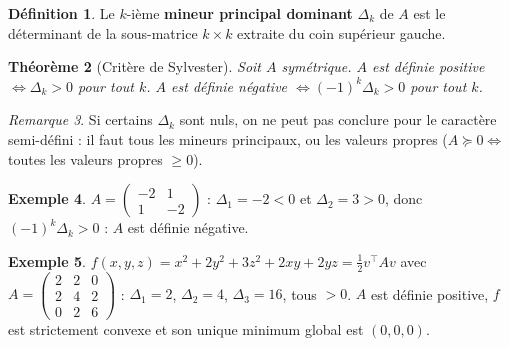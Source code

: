 \documentclass[a4paper,11pt]{report}
\theoremstyle{plain}
\newtheorem{theorem}{Théorème}[]
\theoremstyle{definition}
\newtheorem{definition}[theorem]{Définition}
\newtheorem{exemple}[theorem]{Exemple}
\theoremstyle{remark}
\newtheorem{remarque}[theorem]{Remarque}
\newcommand{\R}{\mathbb{R}}
\newcommand{\T}{^{\!\top}}
\begin{document}
			\begin{definition}
				Le $k$-ième \textbf{mineur principal dominant} $\Delta_k$ de $A$ est le déterminant de la sous-matrice $k\times k$ extraite du coin supérieur gauche.
			\end{definition}
			\begin{theorem}[Critère de Sylvester]
				Soit $A$ symétrique. $A$ est définie positive $\iff\Delta_k>0$ pour tout $k$. $A$ est définie négative $\iff(-1)^k\Delta_k>0$ pour tout $k$.
			\end{theorem}
			\begin{remarque}
				Si certains $\Delta_k$ sont nuls, on ne peut pas conclure pour le caractère semi-défini : il faut tous les mineurs principaux, ou les valeurs propres ($A\succeq0\iff$ toutes les valeurs propres $\ge0$).
			\end{remarque}
			\begin{exemple}
				$A=\begin{pmatrix}-2&1\\1&-2\end{pmatrix}$ : $\Delta_1=-2<0$ et $\Delta_2=3>0$, donc $(-1)^k\Delta_k>0$ : $A$ est définie négative.
			\end{exemple}
			\begin{exemple}
				$f(x,y,z)=x^2+2y^2+3z^2+2xy+2yz=\frac12v\T Av$ avec $A=\begin{pmatrix}2&2&0\\2&4&2\\0&2&6\end{pmatrix}$ : $\Delta_1=2$, $\Delta_2=4$, $\Delta_3=16$, tous $>0$. $A$ est définie positive, $f$ est strictement convexe et son unique minimum global est $(0,0,0)$.
			\end{exemple}
%			
%			
\end{document}
